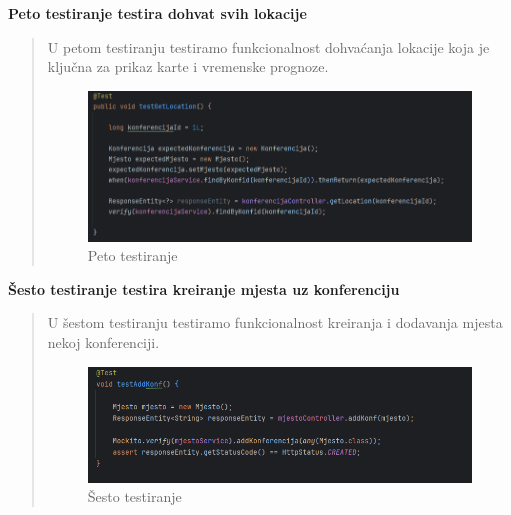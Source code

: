 \begin{packed_enum}
				\item\textbf{Peto testiranje testira dohvat svih lokacije}
				\begin{quote}
					U petom testiranju testiramo funkcionalnost dohvaćanja lokacije koja je ključna za prikaz karte i vremenske prognoze.
					\begin{figure}[H]
						\includegraphics[width=\textwidth]{slike/JUnit5.png} %
						\caption{Peto testiranje}
						\label{fig:JUnit5} %
					\end{figure}
				\end{quote}
				
				\item\textbf{Šesto testiranje testira kreiranje mjesta uz konferenciju}
				\begin{quote}
					U šestom testiranju testiramo funkcionalnost kreiranja i dodavanja mjesta nekoj konferenciji.
					\begin{figure}[H]
						\includegraphics[width=\textwidth]{slike/JUnit6.png} %
						\caption{Šesto testiranje}
						\label{fig:JUnit6} %
					\end{figure}
				\end{quote}
				

\end{packed_enum}
